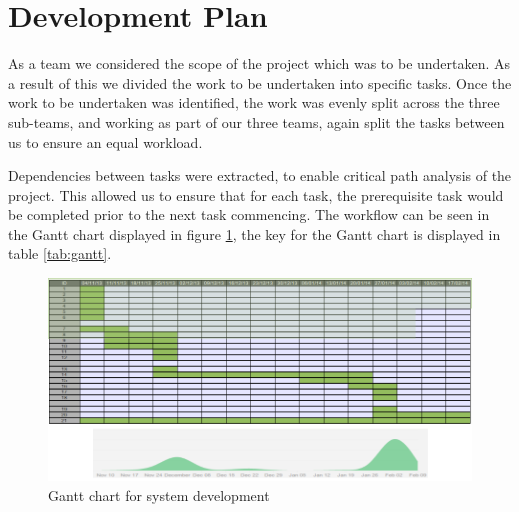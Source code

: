 \section{Development Plan}

As a team we considered the scope of the project which was to be undertaken.
 As a result of this we divided the work to be undertaken into specific tasks.
 Once the work to be undertaken was identified, the work was evenly split across 
the three sub-teams, and working as part of our three teams, again split the 
 tasks between us to ensure an equal workload.
 
Dependencies between tasks were extracted, to enable critical path analysis of the project. 
This allowed us to ensure that for each task, the prerequisite task would be completed 
prior to the next task commencing. The workflow can be seen in the Gantt chart displayed in 
figure \ref{fig:gantt}, the key for the Gantt chart is displayed in table \ref{tab:gantt}.

\begin{figure}[htbp!]
  \centering
  \includegraphics[scale=0.48]{images/GanttChart.png}
  \caption{Gantt chart for system development}
  \label{fig:gantt}
\end{figure}


